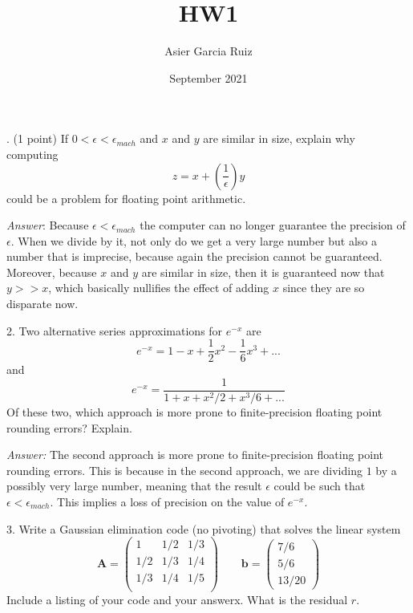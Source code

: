 \documentclass{article}
\title{HW1}
\author{Asier Garcia Ruiz }
\date{September 2021}
\begin{document}
    . (1 point) If $0 < \epsilon <\epsilon_{mach}$ and $x$ and $y$ are similar in size, explain why computing 
    $$z = x + \left(\frac{1}{\epsilon}\right)y$$ could be a problem for floating point arithmetic.

    \textit{Answer}: Because $\epsilon < \epsilon_{mach}$ the computer can no longer guarantee
    the precision of $\epsilon$. When we divide by it, not only do we get a very large number
    but also a number that is imprecise, because again the precision cannot be guaranteed.
    Moreover, because $x$ and $y$ are similar in size, then it is guaranteed now that
    $y >> x$, which basically nullifies the effect of adding $x$ since they are so
    disparate now.

    \vspace{2mm}
    2. Two alternative series approximations for $e^{-x}$ are
    $$e^{-x} = 1 - x + \frac{1}{2}x^2 - \frac{1}{6}x^3 + ...$$ and 
    $$e^{-x} = \frac{1}{1 + x + x^2/2 + x^3/6 + ...}$$
    Of these two, which approach is more prone to finite-precision floating point rounding errors?
    Explain.
    
    \textit{Answer:} The second approach is more prone to finite-precision floating point rounding
    errors. This is because in the second approach, we are dividing $1$ by a possibly very large
    number, meaning that the result $\epsilon$ could be such that $\epsilon < \epsilon_{mach}$. This
    implies a loss of precision on the value of $e^{-x}$.

    \vspace{1cm}
    3. Write  a  Gaussian  elimination  code  (no  pivoting)  that  solves  the  linear  system
    $$\bm{A}=\begin{pmatrix}
        1 & 1/2 &  1/3 \\
        1/2 & 1/3 & 1/4 \\
        1/3 & 1/4 & 1/5 \\
    \end{pmatrix}
    \qquad \bm{b} = \begin{pmatrix}
        7/6 \\ 5/6\\ 13/20
    \end{pmatrix}$$
    Include a listing of your code and your answerx.  What is the residual $r$.
\end{document}
